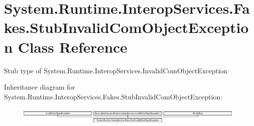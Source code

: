 \hypertarget{class_system_1_1_runtime_1_1_interop_services_1_1_fakes_1_1_stub_invalid_com_object_exception}{\section{System.\-Runtime.\-Interop\-Services.\-Fakes.\-Stub\-Invalid\-Com\-Object\-Exception Class Reference}
\label{class_system_1_1_runtime_1_1_interop_services_1_1_fakes_1_1_stub_invalid_com_object_exception}
}


Stub type of System.\-Runtime.\-Interop\-Services.\-Invalid\-Com\-Object\-Exception 


Inheritance diagram for System.\-Runtime.\-Interop\-Services.\-Fakes.\-Stub\-Invalid\-Com\-Object\-Exception\-:\begin{figure}[H]
\begin{center}
\leavevmode
\includegraphics[height=0.831477cm]{class_system_1_1_runtime_1_1_interop_services_1_1_fakes_1_1_stub_invalid_com_object_exception}
\end{center}
\end{figure}
